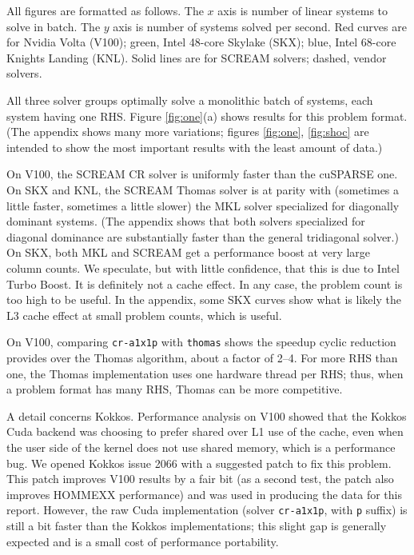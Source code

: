 \documentclass[10pt,twocolumn]{article}
\begin{document}
All figures are formatted as follows.
The $x$ axis is number of linear systems to solve in batch.
The $y$ axis is number of systems solved per second.
Red curves are for Nvidia Volta (V100);
green, Intel 48-core Skylake (SKX);
blue, Intel 68-core Knights Landing (KNL).
Solid lines are for SCREAM solvers; dashed, vendor solvers.

All three solver groups optimally solve a monolithic batch of systems, each system having one RHS.
Figure \ref{fig:one}(a) shows results for this problem format.
(The appendix shows many more variations;
figures \ref{fig:one}, \ref{fig:shoc} are intended to show the most important results with the least amount of data.)

On V100, the SCREAM CR solver is uniformly faster than the cuSPARSE one.
On SKX and KNL, the SCREAM Thomas solver is at parity with (sometimes a little faster, sometimes a little slower) the MKL solver specialized for diagonally dominant systems.
(The appendix shows that both solvers specialized for diagonal dominance are substantially faster than the general tridiagonal solver.)
On SKX, both MKL and SCREAM get a performance boost at very large column counts.
We speculate, but with little confidence, that this is due to Intel Turbo Boost.
It is definitely not a cache effect.
In any case, the problem count is too high to be useful.
In the appendix, some SKX curves show what is likely the L3 cache effect at small problem counts,
which is useful.

On V100, comparing {\tt cr-a1x1p} with {\tt thomas} shows the speedup cyclic reduction provides over the Thomas algorithm,
about a factor of 2--4.
For more RHS than one, the Thomas implementation uses one hardware thread per RHS;
thus, when a problem format has many RHS, Thomas can be more competitive.

A detail concerns Kokkos.
Performance analysis on V100 showed that the Kokkos Cuda backend was choosing
to prefer shared over L1 use of the cache,
even when the user side of the kernel does not use shared memory,
which is a performance bug.
We opened Kokkos issue 2066 with a suggested patch to fix this problem.
This patch improves V100 results by a fair bit (as a second test, the patch also improves HOMMEXX performance) and was used in producing the data for this report.
However, the raw Cuda implementation (solver {\tt cr-a1x1p}, with {\tt p} suffix) is still a bit faster than the Kokkos implementations;
this slight gap is generally expected and is a small cost of performance portability.
\end{document}

